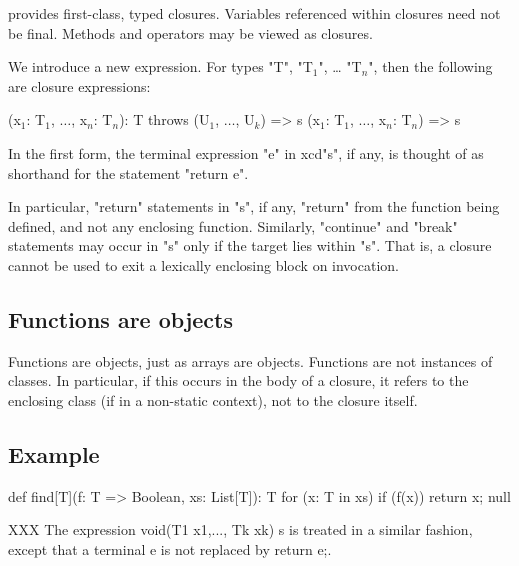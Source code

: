 \Xten{} provides first-class, typed closures.  Variables
referenced within closures need not be final.  Methods and
operators may be viewed as closures.

We introduce a new expression. For types \xcd"T",
\xcdmath"T$_1$", \dots
\xcdmath"T$_n$", then the following are closure expressions:

\begin{xtenmath}
(x$_1$: T$_1$, $\dots$, x$_n$: T$_n$): T throws (U$_1$, $\dots$, U$_k$) => { s }
(x$_1$: T$_1$, $\dots$, x$_n$: T$_n$) => { s }
\end{xtenmath}

In the first form, the terminal expression \xcd"e" in
xcd"s", if any, is thought of as shorthand for the statement
\xcd"return e". 

In particular, \xcd"return" statements in \xcd"s", if any,
\xcd"return" from the function
being defined, and not any enclosing function. Similarly,
\xcd"continue" and
\xcd"break" statements may occur in \xcd"s" only if the target
lies within \xcd"s". That
is, a closure cannot be used to exit a lexically enclosing block on
invocation.

\subsection{Functions are objects}

Functions are objects, just as arrays are objects. Functions are not
instances of classes. In particular, if this occurs in the body of a
closure, it refers to the enclosing class (if in a non-static context),
not to the closure itself.

\subsection{Example}

\begin{xten}
def find[T](f: T => Boolean, xs: List[T]): T {
  for (x: T in xs)
    if (f(x)) return x;
  null
}
\end{xten}


XXX
The expression void(T1 x1,..., Tk xk) { s } is treated in a similar
fashion, except that a terminal e is not replaced by return e;.

